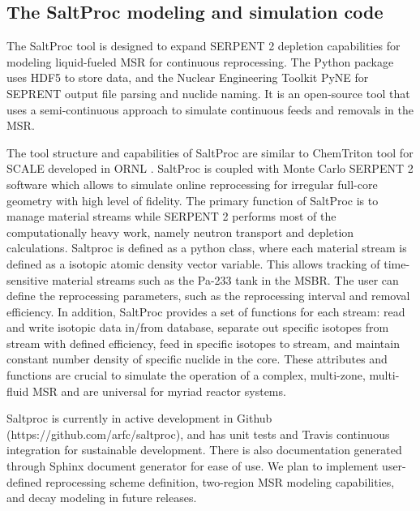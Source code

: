 \subsection{The SaltProc modeling and simulation code}

The SaltProc tool \cite{andrei_rykhlevskii_arfc/saltproc:_201*} is designed to expand SERPENT 2
 depletion capabilities for modeling liquid-fueled \gls{MSR} for continuous reprocessing.
The Python package uses HDF5 \cite{the_hdf_group_hierarchial_1997} to store data, and the Nuclear Engineering Toolkit PyNE \cite{scopatz_pyne:_2012}
for SEPRENT output file parsing and nuclide naming. It is an open-source tool that uses a semi-continuous approach to 
simulate continuous feeds and removals in the \gls{MSR}. 

The tool structure and capabilities of SaltProc are similar to ChemTriton tool for SCALE
developed in \gls{ORNL} \cite{powers_new_2013}. SaltProc is coupled with Monte Carlo SERPENT 2
software which allows to simulate online reprocessing for irregular full-core geometry with 
high level of fidelity.  The primary function of SaltProc is to manage material streams while
SERPENT 2 performs most of the computationally heavy work, namely neutron transport and depletion
calculations. Saltproc is defined as a 
python class, where each material stream is defined as a isotopic atomic density
vector variable. This allows tracking of time-sensitive material streams such as the
Pa-233 tank in the \gls{MSBR}. The user can define the reprocessing parameters, such as the 
reprocessing interval and removal efficiency.  In addition, SaltProc provides a set of functions 
for each stream: read and write isotopic data in/from database, separate out specific isotopes 
from stream with defined efficiency, feed in specific isotopes to stream, and maintain constant 
number density of specific nuclide in the core. These attributes and functions are crucial to 
simulate the operation of a complex, multi-zone, multi-fluid \gls{MSR} and are universal for 
myriad reactor systems.

Saltproc is currently in active development in Github (https://github.com/arfc/saltproc), and has unit tests and
Travis continuous integration for sustainable development. There is also documentation
generated through Sphinx document generator for ease of use. We plan to implement
user-defined reprocessing scheme definition, two-region \gls{MSR} modeling capabilities,
and decay modeling in future releases.


